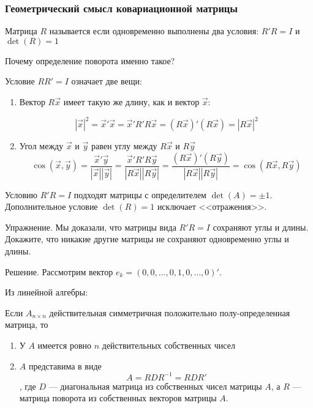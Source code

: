 \subsubsection*{Геометрический смысл ковариационной матрицы}


\begin{mydef}
Матрица $R$ называется  если одновременно выполнены два условия:
$R'R=I$ и $\det(R)=1$
\end{mydef}

Почему определение поворота именно такое?

Условие $RR'=I$ означает две вещи:
\begin{enumerate}
\item Вектор $R\vec{x}$ имеет такую же длину, как и вектор $\vec{x}$:

\begin{equation}
|\vec{x}|^{2}=\vec{x}'\vec{x}=\vec{x}'R'R\vec{x}=(R\vec{x})'(R\vec{x})=|R\vec{x}|^{2}
\end{equation}

\item Угол между $\vec{x}$ и $\vec{y}$ равен углу между $R\vec{x}$ и $R\vec{y}$
\begin{equation}
\cos(\vec{x},\vec{y})=\frac{\vec{x}'\vec{y}}{|\vec{x}||\vec{y}|}=
\frac{\vec{x}'R'R\vec{y}}{|R\vec{x}||R\vec{y}|}=
\frac{(R\vec{x})'(R\vec{y})}{|R\vec{x}||R\vec{y}|}=\cos(R\vec{x},R\vec{y})
\end{equation}
\end{enumerate}

Условию $R'R=I$ подходят матрицы с определителем $\det(A)=\pm 1$. Дополнительное  условие $\det(R)=1$ исключает <<отражения>>.


Упражнение. Мы доказали, что матрицы вида $R'R=I$ сохраняют углы и длины. Докажите, что никакие другие матрицы не сохраняют одновременно углы и длины.

Решение. Рассмотрим вектор $e_{k}=(0,0,\ldots,0,1,0,\ldots,0)'$. 

Из линейной алгебры:
\begin{myth}
Если $A_{n\times n}$ действительная симметричная положительно полу-определенная матрица, то
\begin{enumerate}
\item У $A$ имеется ровно $n$ действительных собственных чисел
\item $A$ представима в виде 
\begin{equation}
A=RDR^{-1}=RDR'
\end{equation}, 
где $D$ --- диагональная матрица из собственных чисел матрицы $A$, а $R$ --- матрица поворота из собственных векторов матрицы $A$.
\end{enumerate}
\end{myth}


